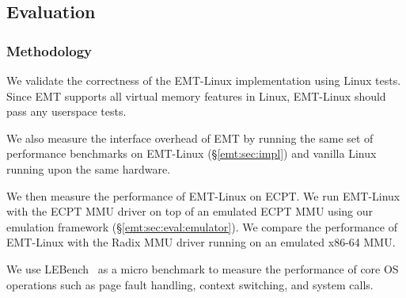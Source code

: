 \subsection{Evaluation}
\label{emt:sec:eval}

\subsubsection{Methodology}
\label{emt:sec:eval:metho}

\noindent
We validate the correctness of the EMT-Linux implementation
	using Linux tests.
Since EMT supports all virtual memory features in Linux,
	EMT-Linux %
	should pass any userspace tests. 

We also measure the interface overhead of EMT by running 
	the same set of performance benchmarks on
	EMT-Linux (\S\ref{emt:sec:impl}) and 
	vanilla Linux running upon the same hardware.

We then measure the performance of EMT-Linux on ECPT. 
We run EMT-Linux with the ECPT MMU driver on top of an emulated ECPT MMU 
	using our emulation framework (\S\ref{emt:sec:eval:emulator}).
We compare the performance of EMT-Linux with the Radix MMU driver
	running on an emulated x86-64 MMU.


We use LEBench~\cite{bench:lebench} as a micro benchmark to measure
the performance of core OS operations such
	as page fault handling, context switching, and system calls. 

